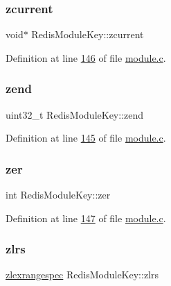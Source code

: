 \subsubsection{\texorpdfstring{zcurrent}{zcurrent}}
{\footnotesize\ttfamily void$\ast$ Redis\+Module\+Key\+::zcurrent}



Definition at line \hyperlink{module_8c_source_l00146}{146} of file \hyperlink{module_8c_source}{module.\+c}.

\mbox{\label{structRedisModuleKey_a0101753e56e6669beaf9ab9f1c001d8d}} 
\subsubsection{\texorpdfstring{zend}{zend}}
{\footnotesize\ttfamily uint32\+\_\+t Redis\+Module\+Key\+::zend}



Definition at line \hyperlink{module_8c_source_l00145}{145} of file \hyperlink{module_8c_source}{module.\+c}.

\mbox{\label{structRedisModuleKey_a6c2fe974a1fdfae1f4a3e935ec77233c}} 
\subsubsection{\texorpdfstring{zer}{zer}}
{\footnotesize\ttfamily int Redis\+Module\+Key\+::zer}



Definition at line \hyperlink{module_8c_source_l00147}{147} of file \hyperlink{module_8c_source}{module.\+c}.

\mbox{\label{structRedisModuleKey_a310d4311b4b95dccd2c0b6ad1c6771ff}} 
\subsubsection{\texorpdfstring{zlrs}{zlrs}}
{\footnotesize\ttfamily \hyperlink{structzlexrangespec}{zlexrangespec} Redis\+Module\+Key\+::zlrs}



